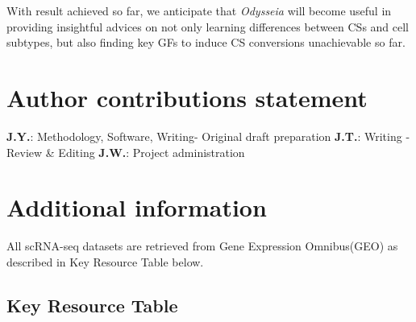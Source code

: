 \documentclass[fleqn,10pt]{wlscirep}
\begin{document}
With result achieved so far, we anticipate that \emph{Odysseia} will become useful in providing insightful advices on not only learning differences between CSs and cell subtypes, but also finding key GFs to induce CS conversions unachievable so far.





\section*{Author contributions statement}
\textbf{J.Y.}: Methodology, Software, Writing- Original draft preparation
\textbf{J.T.}: Writing - Review \& Editing
\textbf{J.W.}: Project administration

\section*{Additional information}
All scRNA-seq datasets are retrieved from Gene Expression Omnibus(GEO) as described in Key Resource Table below.


\subsection*{Key Resource Table}
\end{document}
